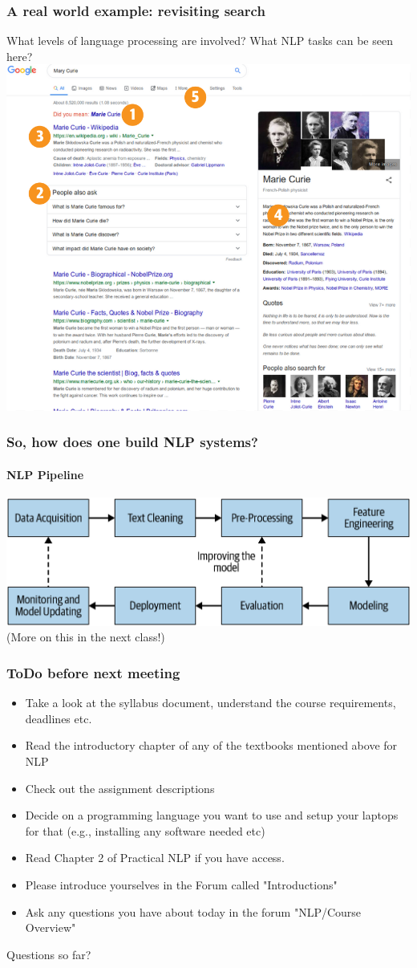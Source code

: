 \documentclass{beamer}
\begin{document}
\begin{frame}
\frametitle{A real world example: revisiting search}
What levels of language processing are involved? What NLP tasks can be seen here? 
\includegraphics[width=\textwidth]{figures/nlpsearch.png}
\end{frame}
    
\begin{frame}
\frametitle{So, how does one build NLP systems?}
\framesubtitle{NLP Pipeline}
\includegraphics[width=\textwidth]{figures/pipeline.png}
(More on this in the next class!)
\end{frame}

\begin{frame}
\frametitle{ToDo before next meeting} 
\begin{itemize}
\item Take a look at the syllabus document, understand the course requirements, deadlines etc.
\item Read the introductory chapter of any of the textbooks mentioned above for NLP 
\item Check out the assignment descriptions 
\item Decide on a programming language you want to use and setup your laptops for that (e.g., installing any software needed etc)
\item Read Chapter 2 of Practical NLP if you have access. 
\item Please introduce yourselves in the Forum called "Introductions"
\item Ask any questions you have about today in the forum "NLP/Course Overview"
\end{itemize}
\end{frame}

\begin{frame}
\Large Questions so far?
\end{frame}
\end{document}

